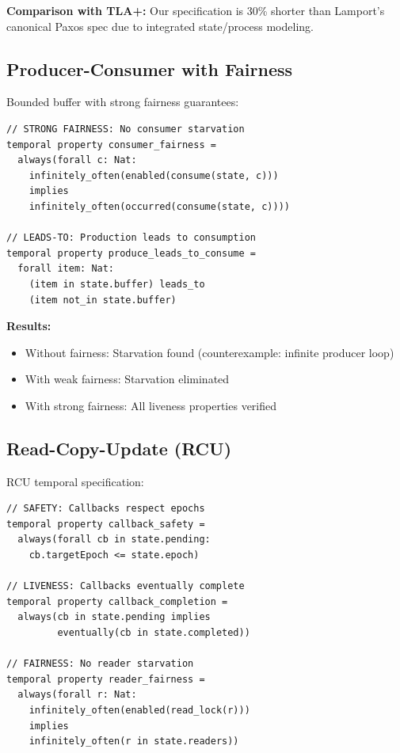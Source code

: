 \documentclass[conference]{IEEEtran}
\begin{document}
\textbf{Comparison with TLA+:} Our specification is 30\% shorter than Lamport's canonical Paxos spec due to integrated state/process modeling.

\subsection{Producer-Consumer with Fairness}

Bounded buffer with strong fairness guarantees:

\begin{lstlisting}[caption={Fairness properties}]
// STRONG FAIRNESS: No consumer starvation
temporal property consumer_fairness =
  always(forall c: Nat:
    infinitely_often(enabled(consume(state, c)))
    implies
    infinitely_often(occurred(consume(state, c))))

// LEADS-TO: Production leads to consumption
temporal property produce_leads_to_consume =
  forall item: Nat:
    (item in state.buffer) leads_to
    (item not_in state.buffer)
\end{lstlisting}

\textbf{Results:}
\begin{itemize}
\item Without fairness: Starvation found (counterexample: infinite producer loop)
\item With weak fairness: Starvation eliminated
\item With strong fairness: All liveness properties verified
\end{itemize}

\subsection{Read-Copy-Update (RCU)}

RCU temporal specification:

\begin{lstlisting}[caption={RCU temporal properties}]
// SAFETY: Callbacks respect epochs
temporal property callback_safety =
  always(forall cb in state.pending:
    cb.targetEpoch <= state.epoch)

// LIVENESS: Callbacks eventually complete
temporal property callback_completion =
  always(cb in state.pending implies
         eventually(cb in state.completed))

// FAIRNESS: No reader starvation
temporal property reader_fairness =
  always(forall r: Nat:
    infinitely_often(enabled(read_lock(r)))
    implies
    infinitely_often(r in state.readers))
\end{lstlisting}
\end{document}
